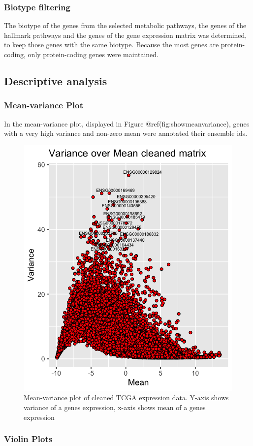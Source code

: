 \documentclass[
  parskip,
  oneside]{scrreprt}
\begin{document}
\hypertarget{biotype-filtering}{%
\subsubsection{Biotype filtering}\label{biotype-filtering}}

The biotype of the genes from the selected metabolic pathways, the genes
of the hallmark pathways and the genes of the gene expression matrix was
determined, to keep those genes with the same biotype. Because the most
genes are protein-coding, only protein-coding genes were maintained.

\hypertarget{descriptive-analysis}{%
\subsection{Descriptive analysis}\label{descriptive-analysis}}

\hypertarget{mean-variance-plot}{%
\subsubsection{Mean-variance Plot}\label{mean-variance-plot}}

In the mean-variance plot, displayed in Figure
@ref(fig:showmeanvariance), genes with a very high variance and non-zero
mean were annotated their ensemble ids.

\begin{figure}

{\centering \includegraphics[width=0.3\linewidth]{figures/Variance_over mean_cleaned_matrix} 

}

\caption{Mean-variance plot of cleaned TCGA expression data. Y-axis shows variance of a genes expression, x-axis shows mean of a genes expression}\label{fig:showmeanvariance}
\end{figure}

\hypertarget{violin-plots}{%
\subsubsection{Violin Plots}\label{violin-plots}}
\end{document}
